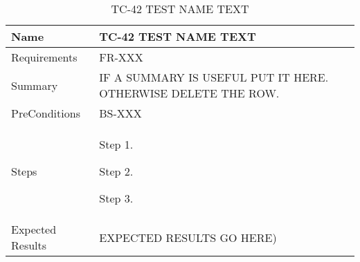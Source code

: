 \begin{table}[htbp!]
\centering
      \begin{tabular}{|p{1.05 in} |p{4.75 in} |}
      \hline
         \rowcolor[rgb]{0.8,0.8,0.8} Name & TC-42 TEST NAME TEXT\\
         \hline
         Requirements & FR-XXX\\  \hline
         Summary & IF A SUMMARY IS USEFUL PUT IT HERE.  OTHERWISE DELETE THE ROW.\\  \hline
         PreConditions & BS-XXX\\     \hline
         Steps &
         \begin{compactenum}
             \item Step 1.
             \item Step 2.
             \item Step 3.
         \end{compactenum}
         \\ \hline
         Expected Results & EXPECTED RESULTS GO HERE)\\
      \hline
      \end{tabular}
      \label{Table:TC-42}
      \caption{TC-42 TEST NAME TEXT}
\end{table} 